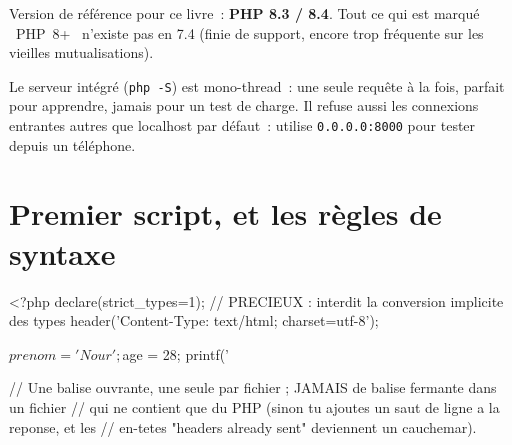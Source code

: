 \documentclass[12pt,a4paper,twoside,openright]{book}
\begin{document}
Version de r\'ef\'erence pour ce livre~: \textbf{PHP 8.3 / 8.4}. Tout ce qui est marqu\'e \og ~PHP~8+~ \fg{}
n'existe pas en 7.4 (finie de support, encore trop fr\'equente sur les vieilles mutualisations).


\begin{note}
Le serveur int\'egr\'e (\verb|php -S|) est mono-thread~: une seule requ\^ete \`a la fois, parfait pour
apprendre, jamais pour un test de charge. Il refuse aussi les connexions entrantes autres que
localhost par d\'efaut~: utilise \verb|0.0.0.0:8000| pour tester depuis un t\'el\'ephone.
\end{note}

\section{Premier script, et les r\`egles de syntaxe}

\begin{codephp}
<?php
declare(strict_types=1);                    // PRECIEUX : interdit la conversion implicite des types
header('Content-Type: text/html; charset=utf-8');

$prenom = 'Nour';
$age = 28;
printf('%

// Une balise ouvrante, une seule par fichier ; JAMAIS de balise fermante dans un fichier
// qui ne contient que du PHP (sinon tu ajoutes un saut de ligne a la reponse, et les
// en-tetes "headers already sent" deviennent un cauchemar).
\end{codephp}
\end{document}
